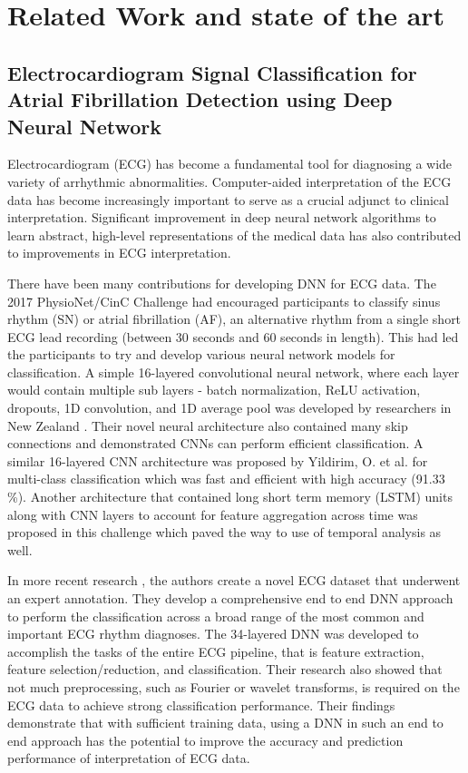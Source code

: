 \chapter{Related Work and state of the art} %
\label{chap:related_work}

\section{Electrocardiogram Signal Classification for Atrial Fibrillation Detection using Deep Neural Network}
\label{sec:ecg_using_DNN}

Electrocardiogram (ECG) has become a fundamental tool for diagnosing a wide variety of arrhythmic abnormalities. Computer-aided interpretation of the ECG data has become increasingly important to serve as a crucial adjunct to clinical interpretation. Significant improvement in deep neural network algorithms to learn abstract, high-level representations of the medical data has also contributed to improvements in ECG interpretation. 

There have been many contributions for developing DNN for ECG data. The 2017 PhysioNet/CinC Challenge \cite{clifford2017af} had encouraged participants to classify sinus rhythm (SN) or atrial fibrillation (AF), an alternative rhythm from a single short ECG lead recording (between 30 seconds and 60 seconds in length). This had led the participants to try and develop various neural network models for classification. A simple 16-layered convolutional neural network, where each layer would contain multiple sub layers - batch normalization, ReLU activation, dropouts, 1D convolution, and 1D average pool was developed by researchers in New Zealand \cite{xiong2017robust}. Their novel neural architecture also contained many skip connections and demonstrated CNNs can perform efficient classification. A similar 16-layered CNN architecture was proposed by Yildirim, O. et al. \cite{yildirim2018arrhythmia} for multi-class classification which was fast and efficient with high accuracy (91.33 \%). Another architecture that contained long short term memory (LSTM) units along with CNN layers to account for feature aggregation across time was proposed in this challenge \cite{zihlmann2017convolutional} which paved the way to use of temporal analysis as well. 

In more recent research \cite{hannun2019cardiologist}, the authors create a novel ECG dataset that underwent an expert annotation. They develop a comprehensive end to end DNN approach to perform the classification across a broad range of the most common and important ECG rhythm diagnoses. The 34-layered DNN was developed to accomplish the tasks of the entire ECG pipeline, that is feature extraction, feature selection/reduction, and classification. Their research also showed that not much preprocessing, such as Fourier or wavelet transforms, is required on the ECG data to achieve strong classification performance. Their findings demonstrate that with sufficient training data, using a DNN in such an end to end approach has the potential to improve the accuracy and prediction performance of interpretation of ECG data.

